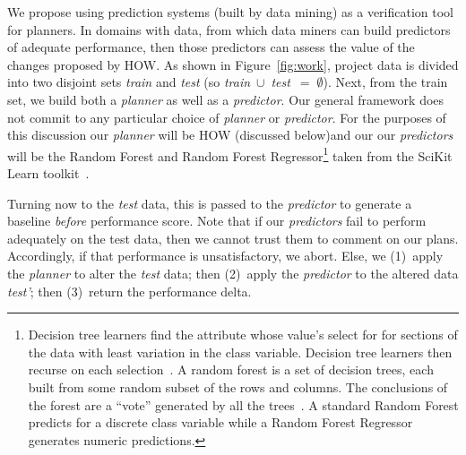 \documentclass[conference]{IEEEtran}
\newcommand{\fig}[1]{Figure~\ref{fig:#1}}
\begin{document}
We propose using prediction systems (built by data mining) as a verification
tool for planners. In domains with data, from which data miners can build
predictors of adequate performance, then those predictors can assess the value
of the changes proposed by HOW.
As shown in \fig{work}, 
project data is divided into two disjoint sets {\em train} and {\em test}
(so \mbox{{\em train} $\cup$ {\em test} $=\;\emptyset$}).
Next, from the train set, we build both a {\em planner} as well
as a {\em predictor}. Our general framework does not   commit to any particular  choice
of {\em planner} or {\em predictor}. For the purposes of this discussion 
our {\em planner}
will be HOW (discussed below)and our
our {\em predictors} will be the Random Forest and Random Forest
Regressor\footnote{Decision tree learners find the attribute whose value's
select for for sections of the data with least variation in the class
variable. Decision tree learners then recurse on each selection~\cite{breiman84}. A random forest is a set of decision trees, each built
from some random subset of the rows and columns. The conclusions
of the forest are a ``vote'' generated by all the trees~\cite{Breiman2001}. 
A standard Random Forest predicts for a discrete class variable while
a Random Forest Regressor generates numeric predictions.} taken from the SciKit
Learn toolkit~\cite{Pedregosa2012}.

Turning now to the {\em test} data, this is passed to the {\em predictor}
to generate a baseline {\em before} performance score.
Note that if our {\em predictors} fail to perform adequately on the test data,
then we cannot trust them to comment on our plans. Accordingly,
if that performance is unsatisfactory, we abort.
Else, we (1)~apply the {\em planner} to alter the {\em test} data;
then (2)~apply the {\em predictor} to the altered data {\em test'};
then (3)~return the performance delta.
\end{document}
